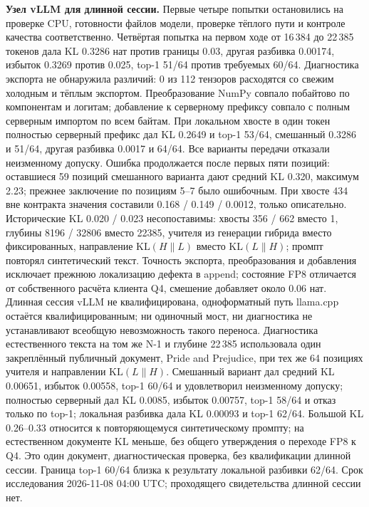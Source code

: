 \textbf{Узел vLLM для длинной сессии.} Первые четыре попытки остановились на проверке CPU,
готовности файлов модели, проверке тёплого пути и контроле качества соответственно.
Четвёртая попытка на первом ходе от 16\,384 до 22\,385 токенов дала KL 0.3286 нат против границы 0.03,
другая разбивка 0.00174, избыток 0.3269 против 0.025, top-1 51/64 против требуемых 60/64.
Диагностика экспорта не обнаружила различий: 0 из 112 тензоров расходятся со свежим холодным и тёплым экспортом.
Преобразование NumPy совпало побайтово по компонентам и логитам;
добавление к серверному префиксу совпало с полным серверным импортом по всем байтам.
При локальном хвосте в один токен полностью серверный префикс дал KL 0.2649 и top-1 53/64,
смешанный 0.3286 и 51/64, другая разбивка 0.0017 и 64/64. Все варианты передачи отказали неизменному допуску.
Ошибка продолжается после первых пяти позиций: оставшиеся 59 позиций смешанного варианта дают средний KL 0.320,
максимум 2.23; прежнее заключение по позициям 5--7 было ошибочным.
При хвосте 434 вне контракта значения составили 0.168 / 0.149 / 0.0012, только описательно.
Исторические KL 0.020 / 0.023 несопоставимы: хвосты 356 / 662 вместо 1,
глубины 8196 / 32806 вместо 22385, учителя из генерации гибрида вместо фиксированных,
направление $\mathrm{KL}(H\|L)$ вместо $\mathrm{KL}(L\|H)$; промпт повторял синтетический текст.
Точность экспорта, преобразования и добавления исключает прежнюю локализацию дефекта в append;
состояние FP8 отличается от собственного расчёта клиента Q4, смешение добавляет около 0.06 нат.
Длинная сессия vLLM не квалифицирована, одноформатный путь llama.cpp остаётся квалифицированным;
ни одиночный мост, ни диагностика не устанавливают всеобщую невозможность такого переноса.
Диагностика естественного текста на том же N-1 и глубине 22\,385 использовала один закреплённый публичный документ,
Pride and Prejudice, при тех же 64 позициях учителя и направлении $\mathrm{KL}(L\|H)$.
Смешанный вариант дал средний KL 0.00651, избыток 0.00558, top-1 60/64 и удовлетворил неизменному допуску;
полностью серверный дал KL 0.0085, избыток 0.00757, top-1 58/64 и отказ только по top-1;
локальная разбивка дала KL 0.00093 и top-1 62/64.
Большой KL 0.26--0.33 относится к повторяющемуся синтетическому промпту;
на естественном документе KL меньше, без общего утверждения о переходе FP8 к Q4.
Это один документ, диагностическая проверка, без квалификации длинной сессии.
Граница top-1 60/64 близка к результату локальной разбивки 62/64.
Срок исследования 2026-11-08 04:00 UTC; проходящего свидетельства длинной сессии нет.

